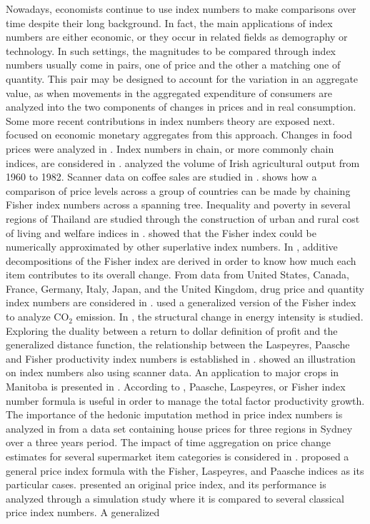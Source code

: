 Nowadays, economists continue to use index numbers to make comparisons over time despite their long background. In fact, the main applications of index numbers are either economic, or they occur in related fields as demography or technology. In such settings, the magnitudes to be compared through index numbers usually come in pairs, one of price and the other a matching one of quantity. This pair may be designed to account for the variation in an aggregate value, as when movements in the aggregated expenditure of consumers are analyzed into the two components of changes in prices and in  real consumption. Some more recent contributions in index numbers theory are exposed next. \cite{barnett1980economic} focused on economic monetary aggregates from this approach. Changes in food prices were analyzed in \cite{lamm1980index}. Index numbers in chain, or more commonly chain indices, are considered in \cite{forsyth1981theory}. \cite{boyle1988economic} analyzed the volume of Irish agricultural output from 1960 to 1982. Scanner data on coffee sales are studied in \cite{de1997estimation}.  \cite{hill1999comparing} shows how a comparison of price levels across a group of countries can be made by chaining Fisher index numbers across a spanning tree. Inequality and poverty in several regions of Thailand are studied through the construction of urban and rural cost of living and welfare indices in \cite{kakwani2002economic}. \cite{dumagan2002comparing} showed that the  Fisher index could be numerically approximated by other superlative index numbers. In \cite{reinsdorf2002additive}, additive decompositions of the Fisher index are derived in order to know how much each item contributes to its overall change. From data from United States, Canada, France, Germany, Italy, Japan, and the United Kingdom, drug price and quantity index numbers are considered in \cite{danzon2000cross}. \cite{ang2004generalized} used a generalized version of the Fisher index to analyze CO$_2$ emission. In \cite{boyd2004note}, the structural change in energy intensity is studied. Exploring the duality between a return to dollar definition of profit and the generalized distance function, the relationship between the Laspeyres, Paasche and Fisher productivity index numbers is established in \cite{zofio2006return}. \cite{hill2006does} showed an illustration on index numbers also using scanner data. An application to major crops in Manitoba is presented in \cite{coyle2007aggregation}. According to \cite{diewert2007measurement}, Paasche, Laspeyres, or Fisher index number formula is useful in order to manage the total factor productivity growth. The importance of the hedonic imputation method in price index numbers is analyzed in \cite{hill2008hedonic} from a data set containing house prices for three regions in Sydney over a three years period. The impact of time aggregation on price change estimates for several supermarket item categories is considered in \cite{ivancic2011scanner}. \cite{bialek2012proposition} proposed a general price index formula with the Fisher, Laspeyres, and Paasche indices as its particular cases. \cite{bialek2014simulation} presented an original price index, and its performance is analyzed through a simulation study where it is compared to several classical price index numbers.  A generalized 